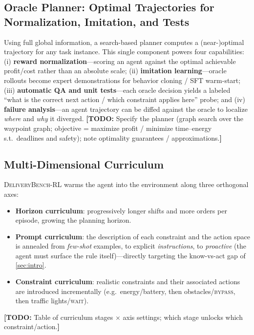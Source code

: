 \documentclass[11pt]{article}
\newcommand{\ours}{\textsc{DeliveryBench-RL}\xspace}
\newcommand{\TODO}[1]{{\color{red}\textbf{[TODO:} #1\textbf{]}}}
\begin{document}
\subsection{Oracle Planner: Optimal Trajectories for Normalization, Imitation, and Tests}
\label{sec:env-oracle}
Using full global information, a search-based planner computes a
(near-)optimal trajectory for any task instance. This single component powers
four capabilities: (i) \textbf{reward normalization}---scoring an agent against
the optimal achievable profit/cost rather than an absolute scale;
(ii) \textbf{imitation learning}---oracle rollouts become expert demonstrations
for behavior cloning / SFT warm-start; (iii) \textbf{automatic QA and unit
tests}---each oracle decision yields a labeled ``what is the correct next
action / which constraint applies here'' probe; and (iv) \textbf{failure
analysis}---an agent trajectory can be diffed against the oracle to localize
\emph{where} and \emph{why} it diverged.
\TODO{Specify the planner (graph search over the waypoint graph; objective =
maximize profit / minimize time--energy s.t.\ deadlines and safety); note
optimality guarantees / approximations.}

\subsection{Multi-Dimensional Curriculum}
\label{sec:env-curriculum}
\ours warms the agent into the environment along three orthogonal axes:
\begin{itemize}[leftmargin=1.4em,itemsep=2pt,topsep=2pt]
  \item \textbf{Horizon curriculum}: progressively longer shifts and more
        orders per episode, growing the planning horizon.
  \item \textbf{Prompt curriculum}: the description of each constraint and the
        action space is annealed from \emph{few-shot} examples, to explicit
        \emph{instructions}, to \emph{proactive} (the agent must surface the
        rule itself)---directly targeting the know-vs-act gap of
        \cref{sec:intro}.
  \item \textbf{Constraint curriculum}: realistic constraints and their
        associated actions are introduced incrementally (e.g.\ energy/battery,
        then obstacles/\textsc{bypass}, then traffic lights/\textsc{wait}).
\end{itemize}
\TODO{Table of curriculum stages $\times$ axis settings; which stage unlocks
which constraint/action.}
\end{document}
